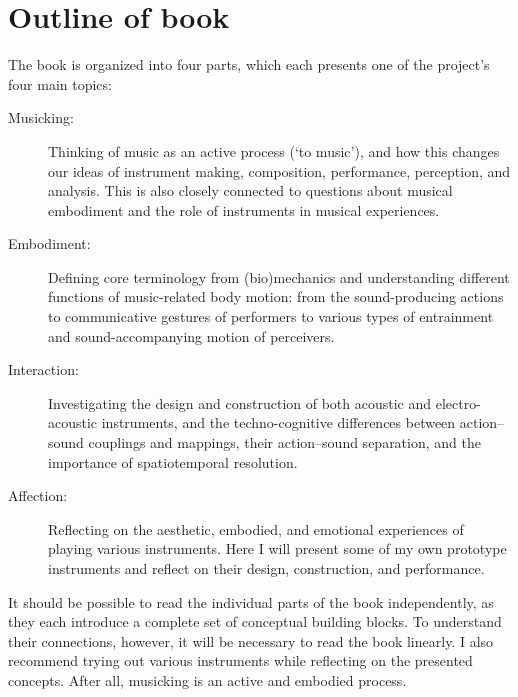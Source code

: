 \section{Outline of book}

The book is organized into four parts, which each presents one of the project's four main topics:

\begin{description}
  \item[Musicking:] Thinking of music as an active process (`to music'), and how this changes our ideas of instrument making, composition, performance, perception, and analysis. This is also closely connected to questions about musical embodiment and the role of instruments in musical experiences.

  \item[Embodiment:] Defining core terminology from (bio)mechanics and understanding different functions of music-related body motion: from the sound-producing actions to communicative gestures of performers to various types of entrainment and sound-accompanying motion of perceivers.

  \item[Interaction:] Investigating the design and construction of both acoustic and electro-acoustic instruments, and the techno-cognitive differences between action--sound couplings and mappings, their action--sound separation, and the importance of spatiotemporal resolution.

  \item[Affection:] Reflecting on the aesthetic, embodied, and emotional experiences of playing various instruments. Here I will present some of my own prototype instruments and reflect on their design, construction, and performance.
\end{description}

It should be possible to read the individual parts of the book independently, as they each introduce a complete set of conceptual building blocks. To understand their connections, however, it will be necessary to read the book linearly. I also recommend trying out various instruments while reflecting on the presented concepts. After all, musicking is an active and embodied process.
